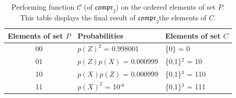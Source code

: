\documentclass[journal,onecolumn]{IEEEtran}
\theoremstyle{thmstyleone}%
\theoremstyle{thmstyletwo}%
\theoremstyle{thmstylethree}%
\begin{document}
		\begin{table}[!hbt]
			\centering
			\caption{\label{examp2}%
				Performing function $\mathcal{C}$ (of $\mathfrak{compr}_{\text{2}}$) on the ordered elements of set $P$. This table displays the final result of $\mathfrak{compr}_{\text{2}}$\textemdash the elements of $C$.}
			
			\begin{tabular}{cll}
				
				\toprule
				Elements of set $P$ & Probabilities & Elements of set $C$ \\
				\toprule
				00 & $p(Z)^{\text{2}}$ = 0.998001 & \{0\} = 0 \\
				01 & $p(Z)p(X)$ = 0.000999 & \{0,1\}$^{\text{2}}$ = 10 \\
				10 & $p(X)p(Z)$ = 0.000999 & \{0,1\}$^{\text{3}}$  = 110 \\
				11 & $p(X)^{\text{2}}$ = 10$^{\text{-6}}$ & \{0,1\}$^{\text{3}}$  = 111 \\
				\bottomrule
			\end{tabular}
			
		\end{table}
		
		
		
		

	
	
\end{document}
